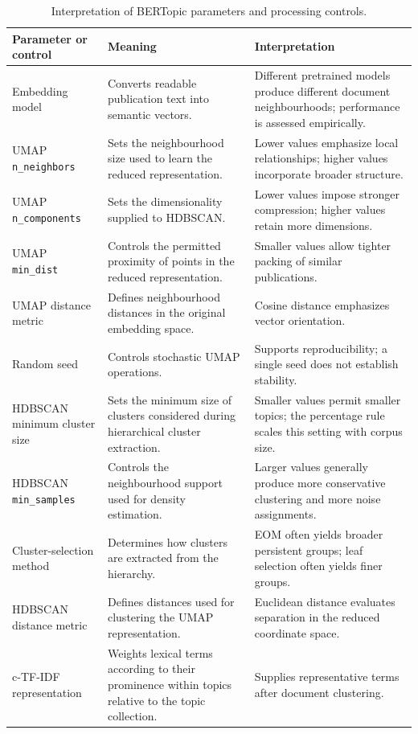 \documentclass[a4paper,fleqn]{cas-sc}
\begin{document}
\begin{table}[htbp]
\centering
\caption{Interpretation of BERTopic parameters and processing controls.}
\label{tab:opf_bertopic_parameter_interpretation}
\scriptsize
\setlength{\tabcolsep}{4pt}
\renewcommand{\arraystretch}{1.15}
\begin{tabularx}{\textwidth}{p{35mm}X p{40mm}}
\toprule
Parameter or control & Meaning & Interpretation \\
\midrule
Embedding model & Converts readable publication text into semantic vectors. & Different pretrained models produce different document neighbourhoods; performance is assessed empirically. \\
UMAP \texttt{n\_neighbors} & Sets the neighbourhood size used to learn the reduced representation. & Lower values emphasize local relationships; higher values incorporate broader structure. \\
UMAP \texttt{n\_components} & Sets the dimensionality supplied to HDBSCAN. & Lower values impose stronger compression; higher values retain more dimensions. \\
UMAP \texttt{min\_dist} & Controls the permitted proximity of points in the reduced representation. & Smaller values allow tighter packing of similar publications. \\
UMAP distance metric & Defines neighbourhood distances in the original embedding space. & Cosine distance emphasizes vector orientation. \\
Random seed & Controls stochastic UMAP operations. & Supports reproducibility; a single seed does not establish stability. \\
HDBSCAN minimum cluster size & Sets the minimum size of clusters considered during hierarchical cluster extraction. & Smaller values permit smaller topics; the percentage rule scales this setting with corpus size. \\
HDBSCAN \texttt{min\_samples} & Controls the neighbourhood support used for density estimation. & Larger values generally produce more conservative clustering and more noise assignments. \\
Cluster-selection method & Determines how clusters are extracted from the hierarchy. & EOM often yields broader persistent groups; leaf selection often yields finer groups. \\
HDBSCAN distance metric & Defines distances used for clustering the UMAP representation. & Euclidean distance evaluates separation in the reduced coordinate space. \\
c-TF-IDF representation & Weights lexical terms according to their prominence within topics relative to the topic collection. & Supplies representative terms after document clustering. \\

\end{tabularx}
\end{table}
\end{document}
